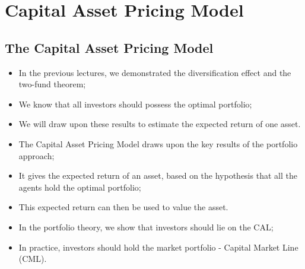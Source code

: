 \documentclass[11pt,a4paper]{report}
\begin{document}
\chapter{Capital Asset Pricing Model}
\section{The Capital Asset Pricing Model}
\begin{itemize}
    \item In the previous lectures, we demonstrated the diversification effect and the two-fund theorem;
    \item We know that all investors should possess the optimal portfolio;
    \item We will draw upon these results to estimate the expected return of one asset.
    \item The Capital Asset Pricing Model draws upon the key results of the portfolio approach;
    \item It gives the expected return of an asset, based on the hypothesis that all the agents hold the optimal portfolio;
    \item This expected return can then be used to value the asset.
    \item In the portfolio theory, we show that investors should lie on the CAL;
    \item In practice, investors should hold the market portfolio - Capital Market Line (CML).
\end{itemize}
\end{document}
